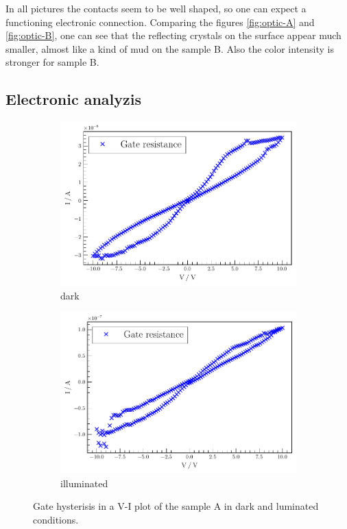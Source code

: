 In all pictures the contacts seem to be well shaped, so one can expect a functioning electronic connection.
Comparing the figures \ref{fig:optic-A} and \ref{fig:optic-B}, one can see that the reflecting crystals on the surface appear much smaller, almost like a kind of mud on the sample B.
Also the color intensity is stronger for sample B.

\subsection{Electronic analyzis}
\label{sec:elec-analyzis}

\begin{figure}
    \centering
\begin{subfigure}{.4\textwidth}
    \centering
    \includegraphics[width=\textwidth]{plots/A_dark.pdf}
    \caption{dark}
\end{subfigure}
\begin{subfigure}{.4\textwidth}
    \centering
    \includegraphics[width=\textwidth]{plots/A_light.pdf}
    \caption{illuminated}
\end{subfigure}
\caption{Gate hysterisis in a V-I plot of the sample A in dark and luminated conditions.}\label{fig:hyst-A}
\end{figure}


